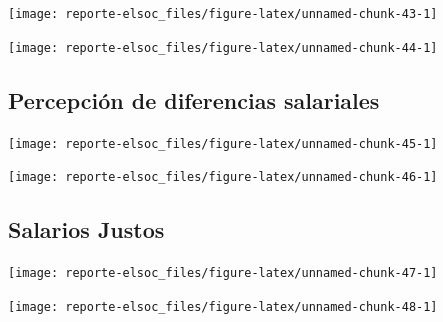 \documentclass[
  12pt,
]{book}
\begin{document}
\begin{center}\texttt{[image: reporte-elsoc\_files/figure-latex/unnamed-chunk-43-1]} \end{center}

\begin{center}\texttt{[image: reporte-elsoc\_files/figure-latex/unnamed-chunk-44-1]} \end{center}

\hypertarget{percepciuxf3n-de-diferencias-salariales}{%
\subsection{Percepción de diferencias salariales}\label{percepciuxf3n-de-diferencias-salariales}}

\begin{center}\texttt{[image: reporte-elsoc\_files/figure-latex/unnamed-chunk-45-1]} \end{center}

\begin{center}\texttt{[image: reporte-elsoc\_files/figure-latex/unnamed-chunk-46-1]} \end{center}

\hypertarget{salarios-justos}{%
\subsection{Salarios Justos}\label{salarios-justos}}

\begin{center}\texttt{[image: reporte-elsoc\_files/figure-latex/unnamed-chunk-47-1]} \end{center}

\begin{center}\texttt{[image: reporte-elsoc\_files/figure-latex/unnamed-chunk-48-1]} \end{center}
\end{document}
